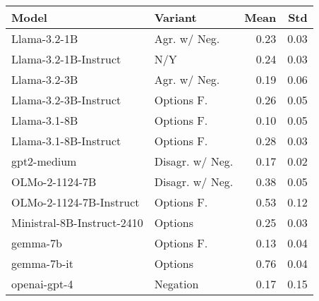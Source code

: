 \begin{tabular}{llrr}
\toprule
Model & Variant & Mean & Std \\
\midrule
Llama-3.2-1B & Agr. w/ Neg. & 0.23 & 0.03 \\
Llama-3.2-1B-Instruct & N/Y & 0.24 & 0.03 \\
Llama-3.2-3B & Agr. w/ Neg. & 0.19 & 0.06 \\
Llama-3.2-3B-Instruct & Options F. & 0.26 & 0.05 \\
Llama-3.1-8B & Options F. & 0.10 & 0.05 \\
Llama-3.1-8B-Instruct & Options F. & 0.28 & 0.03 \\
gpt2-medium & Disagr. w/ Neg. & 0.17 & 0.02 \\
OLMo-2-1124-7B & Disagr. w/ Neg. & 0.38 & 0.05 \\
OLMo-2-1124-7B-Instruct & Options F. & 0.53 & 0.12 \\
Ministral-8B-Instruct-2410 & Options & 0.25 & 0.03 \\
gemma-7b & Options F. & 0.13 & 0.04 \\
gemma-7b-it & Options & 0.76 & 0.04 \\
openai-gpt-4 & Negation & 0.17 & 0.15 \\
\bottomrule
\end{tabular}
